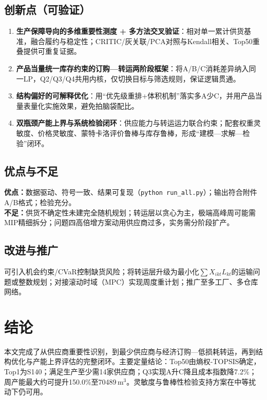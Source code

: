 \documentclass[12pt,a4paper]{ctexart}
\begin{document}
\subsection{创新点（可验证）}
\begin{enumerate}[leftmargin=2em]
\item \textbf{生产保障导向的多维重要性测度 + 多方法交叉验证}：相对单一累计供货基准，融合履约与稳定性；CRITIC/灰关联/PCA对照与Kendall相关、Top50重叠提供可重复证据。
\item \textbf{产品当量统一库存约束的订购—转运两阶段框架}：将A/B/C消耗差异纳入同一LP，Q2/Q3/Q4共用内核，仅切换目标与筛选规则，保证逻辑贯通。
\item \textbf{结构偏好的可解释优化}：用“优先级重排+体积机制”落实多A少C，并用产品当量表量化实施效果，避免拍脑袋配比。
\item \textbf{双瓶颈产能上界与系统检验闭环}：供应能力与转运运力联合约束；配套权重灵敏度、价格灵敏度、蒙特卡洛评价鲁棒与库存鲁棒，形成“建模—求解—检验”闭环。
\end{enumerate}

\subsection{优点与不足}
\textbf{优点：}数据驱动、符号一致、结果可复现（\texttt{python run\_all.py}）；输出符合附件A/B格式；检验充分。\\
\textbf{不足：}供货不确定性未建完全随机规划；转运层以贪心为主，极端高峰周可能需MIP精细拆分；问题四高倍增方案动用供应商过多，实务需分阶段扩产。

\subsection{改进与推广}
可引入机会约束/CVaR控制缺货风险；将转运层升级为最小化$\sum X_{ikt}L_{kt}$的运输问题或整数规划；对接滚动时域（MPC）实现周度重计划；推广至多工厂、多仓库网络。

\section{结论}
本文完成了从供应商重要性识别，到最少供应商与经济订购—低损耗转运，再到结构优化与产能上界评估的完整闭环。主要定量结论：Top50由熵权-TOPSIS确定，Top1为S140；满足生产至少需14家供应商；Q3实现A升C降且成本指数降7.2\%；周产能最大约可提升150.0\%至70489\,m$^3$。灵敏度与鲁棒性检验支持方案在中等扰动下仍可用。
\end{document}
